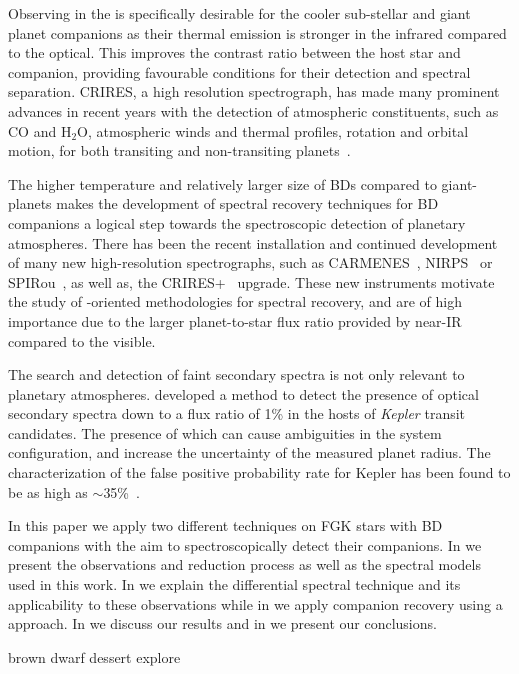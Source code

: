 Observing in the \nir{} is specifically desirable for the cooler sub-stellar and giant planet companions as their thermal emission is stronger in the infrared compared to the optical. This improves the contrast ratio between the host star and companion, providing favourable conditions for their detection and spectral separation.
CRIRES, a high resolution \nir{} spectrograph, has made many prominent advances in recent years with the detection of atmospheric constituents, such as \(\textrm{CO} \) and \(\textrm{H}_{2}\textrm{O} \), atmospheric winds and thermal profiles, rotation and orbital motion, for both transiting and non-transiting planets~\citep[e.g.][]{snellen_orbital_2010, brogi_signature_2012, rodler_weighing_2012, dekok_detection_2013, brogi_carbon_2014, snellen_fast_2014, piskorz_evidence_2016, brogi_rotation_2016, birkby_discovery_2017}.

The higher temperature and relatively larger size of BDs compared to giant-planets makes the development of spectral recovery techniques for BD companions a logical step towards the spectroscopic detection of planetary atmospheres.
There has been the recent installation and continued development of many new high-resolution \nir{} spectrographs, such as {CARMENES}~\citep{quirrenbach_carmenes_2014}, NIRPS~\citep{bouchy_nearinfrared_2017} or SPIRou~\citep{artigau_spirou_2014}, as well as, the {CRIRES+}~\citep{dorn_crires_2016} upgrade.
These new instruments motivate the study of \nir{}-oriented methodologies for spectral recovery, and are of high importance due to the larger planet-to-star flux ratio provided by near-IR compared to the visible.

{\rd{} The search and detection of faint secondary spectra is not only relevant to planetary atmospheres.
\citet{kolbl_detection_2015} developed a method to detect the presence of optical secondary spectra down to a flux ratio of 1\% in the hosts of \emph{Kepler} transit candidates.
The presence of which can cause ambiguities in the system configuration, and increase the uncertainty of the measured planet radius.
The characterization of the false positive probability rate for Kepler has been found to be as high as \(\sim\)35\%~\citet{santerne_sophie_2012}.}

In this paper we apply two different techniques on FGK stars with BD companions with the aim to spectroscopically detect their companions.
In  we present the observations and reduction process as well as the spectral models used in this work.
In  we explain the differential spectral technique and its applicability to these observations while in  we apply companion recovery using a \textchisquared{} approach.
In  we discuss our results and in  we present our conclusions.



brown dwarf dessert explore \citet{ranc_moa2007blg197_2015}




